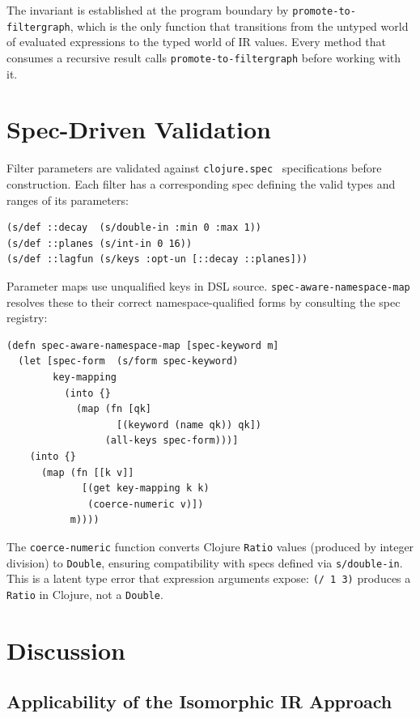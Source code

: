 \documentclass[conference]{IEEEtran}
\begin{document}
The invariant is established at the program boundary by \texttt{promote-to-filtergraph}, which is the only function that transitions from the untyped world of evaluated expressions to the typed world of IR values. Every method that consumes a recursive result calls \texttt{promote-to-filtergraph} before working with it.

\section{Spec-Driven Validation}

Filter parameters are validated against \texttt{clojure.spec}~\cite{clojurespec} specifications before construction. Each filter has a corresponding spec defining the valid types and ranges of its parameters:

\begin{lstlisting}[caption={Example spec for the lagfun filter}]
(s/def ::decay  (s/double-in :min 0 :max 1))
(s/def ::planes (s/int-in 0 16))
(s/def ::lagfun (s/keys :opt-un [::decay ::planes]))
\end{lstlisting}

Parameter maps use unqualified keys in DSL source. \texttt{spec-aware-namespace-map} resolves these to their correct namespace-qualified forms by consulting the spec registry:

\begin{lstlisting}[caption={Namespace resolution via spec introspection}]
(defn spec-aware-namespace-map [spec-keyword m]
  (let [spec-form  (s/form spec-keyword)
        key-mapping
          (into {}
            (map (fn [qk]
                   [(keyword (name qk)) qk])
                 (all-keys spec-form)))]
    (into {}
      (map (fn [[k v]]
             [(get key-mapping k k)
              (coerce-numeric v)])
           m))))
\end{lstlisting}

The \texttt{coerce-numeric} function converts Clojure \texttt{Ratio} values (produced by integer division) to \texttt{Double}, ensuring compatibility with specs defined via \texttt{s/double-in}. This is a latent type error that expression arguments expose: \texttt{(/ 1 3)} produces a \texttt{Ratio} in Clojure, not a \texttt{Double}.

\section{Discussion}

\subsection{Applicability of the Isomorphic IR Approach}
\end{document}
